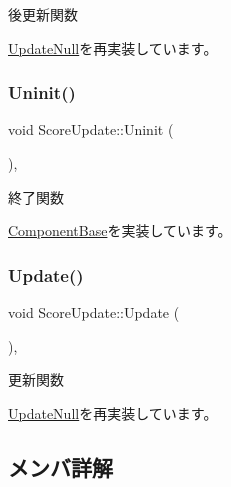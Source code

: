 後更新関数 



\mbox{\hyperlink{class_update_null_ac68da1ba7f3fbcae833442bb1c169200}{Update\+Null}}を再実装しています。

\mbox{\label{class_score_update_a701d9c84c3ef92b1c54f33b37e23605f}} 
\subsubsection{\texorpdfstring{Uninit()}{Uninit()}}
{\footnotesize\ttfamily void Score\+Update\+::\+Uninit (\begin{DoxyParamCaption}{ }\end{DoxyParamCaption})\hspace{0.3cm}{\ttfamily [override]}, {\ttfamily [virtual]}}



終了関数 



\mbox{\hyperlink{class_component_base_a9f42beaf0383d6f629819579cab4de57}{Component\+Base}}を実装しています。

\mbox{\label{class_score_update_aae2b398784079a651ed92eb4c634b1c9}} 
\subsubsection{\texorpdfstring{Update()}{Update()}}
{\footnotesize\ttfamily void Score\+Update\+::\+Update (\begin{DoxyParamCaption}{ }\end{DoxyParamCaption})\hspace{0.3cm}{\ttfamily [override]}, {\ttfamily [virtual]}}



更新関数 



\mbox{\hyperlink{class_update_null_a692f4f34e4ef35ca286a1d3606fdf473}{Update\+Null}}を再実装しています。



\subsection{メンバ詳解}
\mbox{\label{class_score_update_ab78fc9ad68faf9f5be01096b5d60959e}} 
